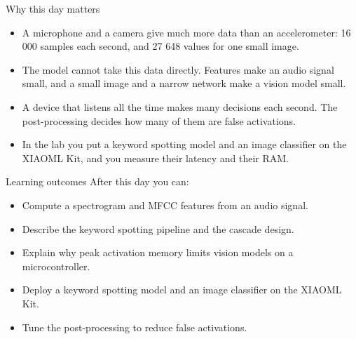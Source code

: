 \begin{frame}{Why this day matters}
  \begin{itemize}
    \item A microphone and a camera give much more data than an accelerometer:
          16 000 samples each second, and 27 648 values for one small image.
    \item The model cannot take this data directly. Features make an audio
          signal small, and a small image and a narrow network make a vision
          model small.
    \item A device that listens all the time makes many decisions each second.
          The post-processing decides how many of them are false activations.
    \item In the lab you put a keyword spotting model and an image classifier
          on the XIAOML Kit, and you measure their latency and their RAM.
  \end{itemize}
\end{frame}

\begin{frame}{Learning outcomes}
  After this day you can:
  \begin{itemize}
    \item Compute a spectrogram and MFCC features from an audio signal.
    \item Describe the keyword spotting pipeline and the cascade design.
    \item Explain why peak activation memory limits vision models on a
          microcontroller.
    \item Deploy a keyword spotting model and an image classifier on the
          XIAOML Kit.
    \item Tune the post-processing to reduce false activations.
  \end{itemize}
\end{frame}
